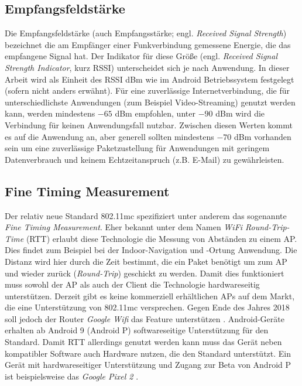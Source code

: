 \documentclass[10pt]{scrartcl}
\begin{document}
\subsection{Empfangsfeldstärke}
\label{rssi}
Die Empfangsfeldstärke (auch Empfangsstärke; engl. \textit{Received Signal Strength}) bezeichnet die am Empfänger einer Funkverbindung gemessene Energie, die das empfangene Signal hat. Der Indikator für diese Größe (engl. \textit{Received Signal Strength Indicator}, kurz RSSI) unterscheidet sich je nach Anwendung. In dieser Arbeit wird als Einheit des RSSI dBm wie im Android Betriebssystem festgelegt (sofern nicht anders erwähnt). Für eine zuverlässige Internetverbindung, die für unterschiedlichste Anwendungen (zum Beispiel Video-Streaming) genutzt werden kann, werden mindestens $-65$ dBm empfohlen, unter $-90$ dBm wird die Verbindung für keinen Anwendungsfall nutzbar. Zwischen diesen Werten kommt es auf die Anwendung an, aber generell sollten mindestens $-70$ dBm vorhanden sein um eine zuverlässige Paketzustellung für Anwendungen mit geringem Datenverbrauch und keinem Echtzeitanspruch (z.B. E-Mail) zu gewährleisten. \cite{metageek}

\subsection{Fine Timing Measurement}
\label{rtt}
Der relativ neue Standard 802.11mc spezifiziert unter anderem das sogenannte \textit{Fine Timing Measurement}. Eher bekannt unter dem Namen \textit{WiFi Round-Trip-Time} (RTT) erlaubt diese Technologie die Messung von Abständen zu einem AP. Dies findet zum Beispiel bei der Indoor-Navigation und -Ortung Anwendung. Die Distanz wird hier durch die Zeit bestimmt, die ein Paket benötigt um zum AP und wieder zurück (\textit{Round-Trip}) geschickt zu werden. Damit dies funktioniert muss sowohl der AP als auch der Client die Technologie hardwareseitig unterstützen. Derzeit gibt es keine kommerziell erhältlichen APs auf dem Markt, die eine Unterstützung von 802.11mc versprechen. Gegen Ende des Jahres 2018 soll jedoch der Router \textit{Google Wifi} das Feature unterstützen \cite{goowifi}. Android-Geräte erhalten ab Android 9 (Android P) softwareseitige Unterstützung für den Standard. Damit RTT allerdings genutzt werden kann muss das Gerät neben kompatibler Software auch Hardware nutzen, die den Standard unterstützt. Ein Gerät mit hardwareseitiger Unterstützung und Zugang zur Beta von Android P ist beispielsweise das \textit{Google Pixel 2} \cite{goowifi}.
\end{document}
